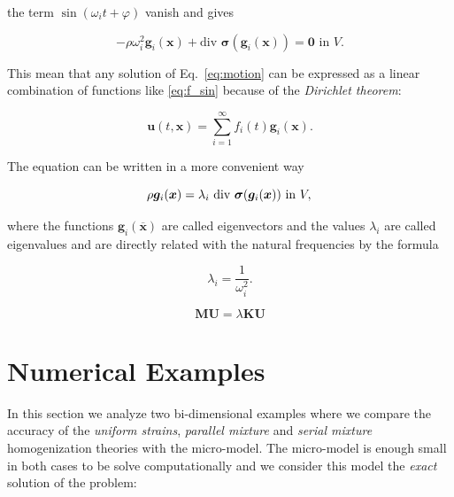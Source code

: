 \documentclass[review]{elsarticle}
\begin{document}
\noindent
the term $\sin (\omega_i t + \varphi)$ vanish and gives

\begin{equation}
- \rho \omega_i^2 \bm{g}_i(\bm{x}) +
\text{div } \bm{\sigma}(\bm{g}_i(\bm{x})) 
= \bm{0} \text{ in } V.
\label{eq:motion}
\end{equation}

This mean that any solution of Eq.~\ref{eq:motion} can be expressed as a linear
combination of functions like \ref{eq:f_sin} because of the \emph{Dirichlet
theorem}:

\begin{equation}
\bm{u}(t,\bm{x}) = \sum_{i=1}^{\infty} f_i(t)
\bm{g}_i(\bm{x}).
\label{eq:dir_teo}
\end{equation}

The equation can be written in a more convenient way

\begin{equation}
\rho \bm{g}_i(\bm{x}) = 
\lambda_i  \text{ div } \bm{\sigma}(\bm{g}_i(\bm{x})) 
\text{ in } V,\\
\label{eq:motion}
\end{equation}

\noindent
where the functions $\bm{g}_i(\overline{\bm{x}})$ are called eigenvectors and the
values $\lambda_i$ are called eigenvalues and are directly related with the
natural frequencies by the formula

\begin{equation}
\lambda_i = \frac{1}{\omega_i^2}.
\label{eq:motion}
\end{equation}

\begin{equation}
\bm{M}\bm{U} = \lambda \bm{K}\bm{U}
\label{eq:equil_matricial}
\end{equation}


\section{Numerical Examples}

In this section we analyze two bi-dimensional examples where we compare the accuracy of
the \emph{uniform strains}, \emph{parallel mixture} and \emph{serial mixture}
homogenization theories with the micro-model. The micro-model is enough small in
both cases to be solve computationally and we consider this model the
\emph{exact} solution of the problem:
\end{document}

